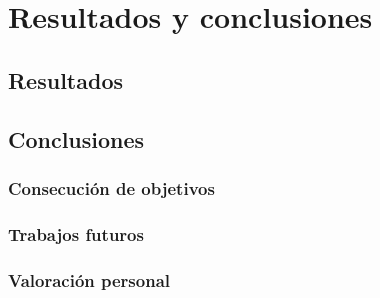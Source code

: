 \chapter{Resultados y conclusiones}
\label{cha:results}


\section{Resultados}

\section{Conclusiones}

\subsection{Consecución de objetivos}
\subsection{Trabajos futuros}
\subsection{Valoración personal}
